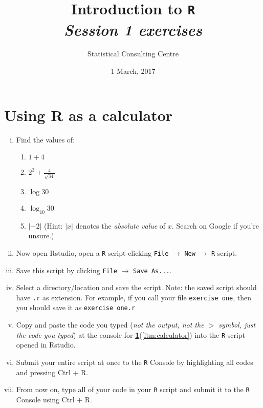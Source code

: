 \documentclass[12pt,a4paper]{article}
\begin{document}
\setlength\parindent{0cm}
\title{\Large{\textbf{Introduction to \texttt{R}}}\\
\textit{Session 1 exercises}}
\author{Statistical Consulting Centre}
\date{1 March, 2017}
\maketitle

\section{Using \textbf{R} as a calculator}
\label{sec:use-r-as}

\begin{enumerate}[(i)]

\item \label{itm:calculator} Find the values of:
  \begin{enumerate}
  \item $1+4$
  \item $2^3 + \frac{4}{\sqrt{34}}$
  \item $\log{30}$
  \item $\log_{10}30$
  \item $|-2|$ \hspace{0.2cm}(Hint: $|x|$ denotes the \emph{absolute
      value} of $x$. Search on Google if you're unsure.)
  \end{enumerate}
\item Now open Rstudio, open a \texttt{R} script clicking \texttt{File}
  $\rightarrow$ \texttt{New} $\rightarrow$ \texttt{R} script.
\item Save this script by clicking \texttt{File} $\rightarrow$
  \texttt{Save As...}.
\item Select a directory/location and save the script. Note: the saved
  script should have \texttt{.r} as extension. For example, if you
  call your file \texttt{exercise one}, then you should save it as
  \texttt{exercise one.r}
\item Copy and paste the code you typed (\emph{not the output, not the
  $>$ symbol, just the code you typed}) at the console for {\bf
    \ref{sec:use-r-as}}(\ref{itm:calculator}) into the \texttt{R}
  script opened in Rstudio.
\item Submit your entire script at once to the \texttt{R}
  Console by highlighting all codes and pressing Ctrl $+$ R.
\item From now on, type all of your code in your \texttt{R} script and
  submit it to the \texttt{R} Console using Ctrl $+$ R.

\end{enumerate}
\end{document}
